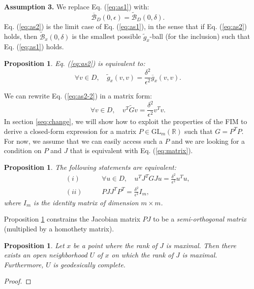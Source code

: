 \documentclass[entropy,article,submit,pdftex,moreauthors]{Definitions/mdpi}
\newcommand{\R}{\ensuremath{\mathbb{R}}}
\newcommand{\GL}{\ensuremath{\text{GL}}}
\theoremstyle{plain}
\newtheorem{proposition}[theorem]{Proposition}
\theoremstyle{definition}
\newcommand{\B}{\mathcal{B}}
\newcommand{\gb}{\overline{g}}
\begin{document}
\noindent \textbf{Assumption 3.} We replace Eq. (\ref{eq:as1}) with:
\begin{equation}
    \label{eq:as2}
    \overline{\B}_{D}(0, \epsilon) = \widetilde{\B}_{D}(0, \delta).
\end{equation}
Eq. (\ref{eq:as2}) is the limit case of Eq. (\ref{eq:as1}), in the sense that if Eq. (\ref{eq:as2}) holds, then $\widetilde{\B}_x(0, \delta)$ is the smallest possible $\tilde{g}_x$-ball (for the inclusion) such that Eq. (\ref{eq:as1}) holds.
\begin{proposition}
    \label{prop:as2}
    Eq. (\ref{eq:as2}) is equivalent to:
    \begin{equation}
        \label{eq:as2-2}
        \forall v \in D, \quad \tilde{g}_x(v,v) = \frac{\delta^2}{\epsilon^2} \gb_x(v,v).
    \end{equation}
\end{proposition}
\noindent We can rewrite Eq. (\ref{eq:as2-2}) in a matrix form:
\begin{equation}
\label{eq:matrix}
    \forall v \in D, \quad v^T \widetilde{G} v = \frac{\delta^2}{\epsilon^2} v^T v.
\end{equation}
\noindent In section \ref{seq:change}, we will show how to exploit the properties of the FIM to derive a closed-form expression for a matrix $P \in \GL_m(\R)$ such that $G = P^TP$. For now, we assume that we can easily access such a $P$ and we are looking for a condition on $P$ and $J$ that is equivalent with Eq. (\ref{eq:matrix}).

\begin{proposition}
    \label{th:main}
    The following statements are equivalent:
    \begin{align*}
        (i)& \qquad \forall u \in D, \quad u^TJ^TGJu = \frac{\delta^2}{\epsilon^2} u^Tu, \\
        (ii)& \qquad PJJ^TP^T = \frac{\delta^2}{\epsilon^2} I_m,
    \end{align*}
    where $I_m$ is the identity matrix of dimension $m \times m$.
\end{proposition}
Proposition \ref{th:main} constrains the Jacobian matrix $PJ$ to be a \emph{semi-orthogonal matrix} (multiplied by a homothety matrix).
\begin{proposition}
Let $x$ be a point where the rank of $J$ is maximal. Then there exists an open neighborhood $U$ of $x$ on which the rank of $J$ is maximal. Furthermore, $U$ is geodesically complete.
\end{proposition}
\begin{proof}
    
\end{proof}
\end{document}
